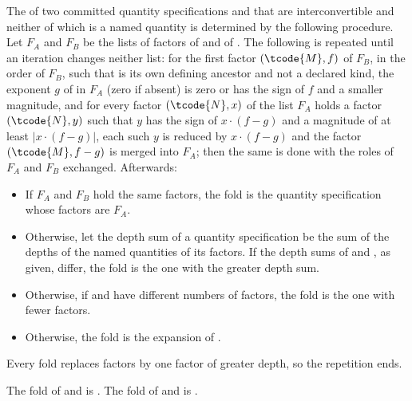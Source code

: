 \pnum
The  of two committed quantity specifications  and 
that are interconvertible and neither of which is a named quantity
is determined by the following procedure.
Let $F_A$ and $F_B$ be the lists of factors of  and of .
The following is repeated until an iteration changes neither list:
for the first factor $(\tcode{M}, f)$ of $F_B$, in the order of $F_B$, such that
 is its own defining ancestor and not a declared kind,
the exponent $g$ of  in $F_A$ (zero if absent) is zero or has the sign of $f$ and a smaller magnitude,
and for every factor $(\tcode{N}, x)$ of  the list $F_A$ holds
a factor $(\tcode{N}, y)$ such that $y$ has the sign of $x \cdot (f - g)$
and a magnitude of at least $|x \cdot (f - g)|$,
each such $y$ is reduced by $x \cdot (f - g)$ and
the factor $(\tcode{M}, f - g)$ is merged into $F_A$;
then the same is done with the roles of $F_A$ and $F_B$ exchanged.
Afterwards:
\begin{itemize}
\item
If $F_A$ and $F_B$ hold the same factors,
the fold is the quantity specification whose factors are $F_A$.
\item
Otherwise, let the depth sum of a quantity specification be
the sum of the depths of the named quantities of its factors.
If the depth sums of  and , as given, differ, the fold is the one with the greater depth sum.
\item
Otherwise, if  and  have different numbers of factors,
the fold is the one with fewer factors.
\item
Otherwise, the fold is the expansion of .
\end{itemize}
\begin{note}
Every fold replaces factors by one factor of greater depth, so the repetition ends.
\end{note}
\begin{example}
The fold of  and 
is .
The fold of  and 
is .
\end{example}

